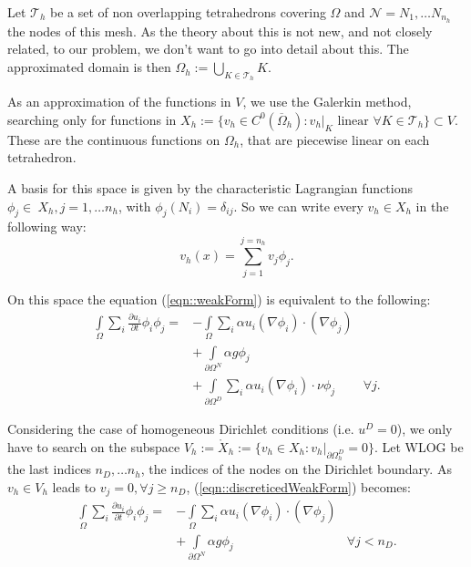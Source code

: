 Let $\mathcal{T}_h$ be a set of non overlapping tetrahedrons covering $\Omega$ and $\mathcal{N}={N_1,\dots N_{n_h}}$ the nodes of this mesh. As the theory about this is not new, and not closely related, to our problem, we don't want to go into detail about this. The approximated domain is then $\Omega_h:=\bigcup_{K\in\mathcal{T}_h}K$.

As an approximation of the functions in $V$, we use the Galerkin method, searching only for functions in $X_h:=\{v_h\in C^0(\overline{\Omega}_h) : v_h|_K \text{ linear } \forall K\in \mathcal{T}_h\}\subset V$. These are the continuous functions on $\Omega_h$, that are piecewise linear on each tetrahedron.

A basis for this space is given by the characteristic Lagrangian functions $\phi_j\in\ X_h, j=1,\dots n_h$, with $\phi_j(N_i) = \delta_{ij}$. So we can write every $v_h\in X_h$ in the following way:
\begin{equation*}
        v_h(x) = \sum_{j=1}^{j=n_h}v_j\phi_j.
\end{equation*}

On this space the equation (\ref{eqn::weakForm}) is equivalent to the following:
\begin{equation}
\label{eqn::discreticedWeakForm}
\begin{aligned}
        \int\limits_{\Omega} \sum_i \frac{\partial u_i}{\partial t} \phi_i \phi_j = &-\int\limits_{\Omega} \sum_i \alpha u_i(\nabla \phi_i) \cdot (\nabla \phi_j) \\
        &+ \int\limits_{\partial\Omega^N} \alpha g\phi_j \\
        &+ \int\limits_{\partial\Omega^D} \sum_i \alpha u_i (\nabla \phi_i) \cdot \nu \phi_j & \forall j.
\end{aligned}
\end{equation}

Considering the case of homogeneous Dirichlet conditions (i.e. $u^D=0$), we only have to search on the subspace $V_h:=\mathring{X}_h:=\{v_h\in X_h : v_h|_{\partial\Omega_h^D} = 0\}$. Let WLOG be the last indices $n_D,\dots n_h$, the indices of the nodes on the Dirichlet boundary. As $v_h\in V_h$ leads to $v_j = 0, \forall j\geq n_D$, (\ref{eqn::discreticedWeakForm}) becomes:
\begin{equation}
\label{eqn::homogeneousForm}
\begin{aligned}
        \int\limits_{\Omega} \sum_i \frac{\partial u_i}{\partial t} \phi_i \phi_j = &-\int\limits_{\Omega} \sum_i \alpha u_i(\nabla \phi_i) \cdot (\nabla \phi_j) \\
        &+ \int\limits_{\partial\Omega^N} \alpha g\phi_j
         & \forall j < n_D.
\end{aligned}
\end{equation}

